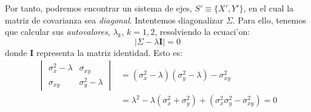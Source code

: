 Por tanto, podremos encontrar un sistema de ejes, $S'\equiv\{X',Y'\}$,
en el cual la matriz de covarianza sea \emph{diagonal}. Intentemos
diagonalizar $\Sigma$.  Para ello, tenemos que calcular sus 
\emph{autovalores}, $\lambda_k$, $k=1,2$, resolviendo la ecuaci'on:
%
\begin{equation}
  \label{eq:eigen}
  |\Sigma - \lambda \mathbf{I}| = 0
\end{equation}
% 
donde $\mathbf{I}$ representa la matriz identidad. Esto es:
%
\begin{equation}
  \label{eq:eigen2}
  \begin{split}
    \begin{vmatrix}
      \sigma_x^2-\lambda & \sigma_{xy} \\ \sigma_{xy} & \sigma_y^2-\lambda
    \end{vmatrix}
    & = (\sigma_x^2-\lambda)(\sigma_y^2-\lambda) - \sigma_{xy}^2 \\
    & = \lambda^2 - \lambda(\sigma_x^2+\sigma_y^2) + 
    (\sigma_x^2\sigma_y^2 - \sigma_{xy}^2)  = 0
  \end{split}
\end{equation}

